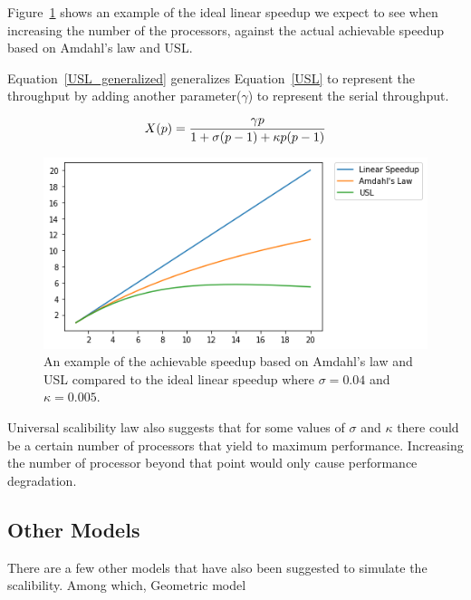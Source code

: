 Figure~\ref{fig_Amdahl} shows an example of the ideal linear speedup we expect to see when increasing the number of the processors, against the actual achievable speedup based on Amdahl's law and USL.

Equation~\ref{USL_generalized} generalizes Equation~\ref{USL} to represent the throughput by adding another parameter($\gamma$) to represent the serial throughput.

\begin{equation}\label{USL_generalized}
X(p) = \frac{\gamma{p}}{1+\sigma(p-1)+\kappa{p}(p-1)}\\
\end{equation}

\begin{figure}[H]
	\centering
	\includegraphics[width=1\linewidth]{images/Amdahls.png}
	\caption{An example of the achievable speedup based on Amdahl's law and USL compared to the ideal linear speedup where $\sigma=0.04$ and $\kappa=0.005$.}	
	\label{fig_Amdahl}
\end{figure}

Universal scalibility law also suggests that for some values of $\sigma$ and $\kappa$ there could be a certain number of processors that yield to maximum performance\cite{gunther2007guerrilla}. Increasing the number of processor beyond that point would only cause performance degradation.  

\vspace{\baselineskip}
\subsection{Other Models}	
There are a few other models that have also been suggested to simulate the scalibility. Among which, Geometric model 
